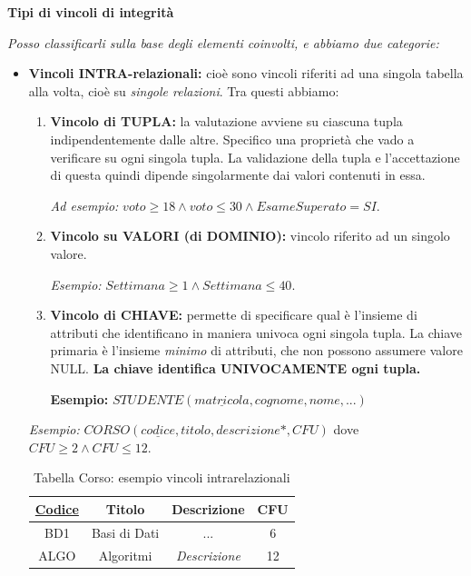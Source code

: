 \documentclass{article}
\begin{document}
\textbf{Tipi di vincoli di integrità}

\textit{Posso classificarli sulla base degli elementi coinvolti, e abbiamo due categorie:}
\begin{itemize}
    \item \textbf{Vincoli INTRA-relazionali:} cioè sono vincoli riferiti ad una singola tabella alla volta, cioè su \textit{singole relazioni}. Tra questi abbiamo: \begin{enumerate}
        \item \textbf{Vincolo di TUPLA:} la valutazione avviene su ciascuna tupla indipendentemente dalle altre. Specifico una proprietà che vado a verificare su ogni singola tupla. La validazione della tupla e l'accettazione di questa quindi dipende singolarmente dai valori contenuti in essa. 

        \textit{Ad esempio:} $voto\geq 18 \land voto \leq 30 \land EsameSuperato = SI$.

        \item \textbf{Vincolo su VALORI (di DOMINIO):} vincolo riferito ad un singolo valore. 

        \textit{Esempio:} $Settimana \geq 1 \land Settimana \leq 40 $.

        \item \textbf{Vincolo di CHIAVE:} permette di specificare qual è l'insieme di attributi che identificano in maniera univoca ogni singola tupla. La chiave primaria è l'insieme \emph{minimo} di attributi, che non possono assumere valore NULL. \textbf{La chiave identifica UNIVOCAMENTE ogni tupla.}

        \textbf{Esempio:} $STUDENTE(\underline{matricola}, cognome, nome, ...)$
    \end{enumerate}

    
\textit{Esempio: } $CORSO(\underline{codice}, titolo, descrizione*, CFU)$ dove $CFU \geq 2 \land CFU \leq 12.$
    \begin{table}[h!]
    \centering
    \begin{tabular}{|c|c|c|c|}
    \hline
        \textbf{\underline{Codice}} &  \textbf{Titolo} & \textbf{Descrizione} & \textbf{CFU} \\
        \hline
        BD1 & Basi di Dati &  ... & 6 \\
        \hline
        ALGO & Algoritmi & \textit{Descrizione} &  12 \\
        \hline
        
    \end{tabular}
    \caption{Tabella Corso: esempio vincoli intrarelazionali}
    \end{table}
    

\end{itemize}
\end{document}
